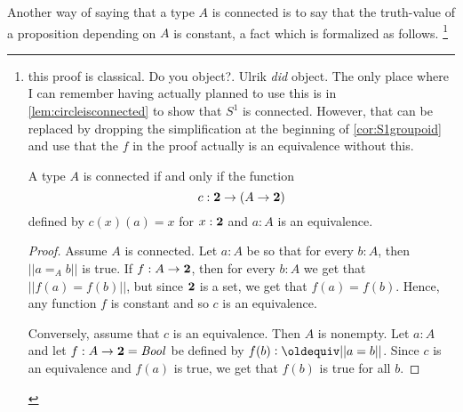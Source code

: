 Another way of saying that a type $A$ is connected is to say that the truth-value of a proposition depending on $A$ is constant, a fact which is formalized as follows.
\footnote{this proof is classical.  Do you object?.   Ulrik \emph{did} object.  
The only place where I can remember having actually planned to use  this is in \cref{lem:circleisconnected} to show that $S^1$ is connected.  However, that can be replaced by dropping the simplification at the beginning of  \cref{cor:S1groupoid} and use that the $f$ in the proof actually is an equivalence without this. 

\begin{lemma}
  \label{lem:classicalconnected}
  A type $A$ is connected if and only if the function 
$$c:\mathbf{2} \to(A\to\mathbf{2} )$$ defined by $c(x)(a)=x$ for $x:\mathbf{2} $ and $a:A$ 
is an equivalence. 
\end{lemma}
  \begin{proof}    
    Assume $A$ is connected.  Let $a:A$ be so that for every $b:A$, then $||a=_Ab||$ is true.  If $f:A\to\mathbf{2} $, then for every $b:A$ we get that $||f(a)=f(b)||$, but since $\mathbf{2} $ is a set, we get that $f(a)=f(b)$.  Hence, any function $f$ is constant and so $c$ is an equivalence.

Conversely, assume that $c$ is an equivalence.  Then $A$ is nonempty.  Let $a:A$ and let $f:A\to \mathbf{2} =\mathop{\mathit{Bool}}$ be defined by $f(b)\defequi||a=b||$.  Since $c$ is an equivalence and $f(a)$ is true, we get that $f(b)$ is true for all $b$.   
  \end{proof}
}

